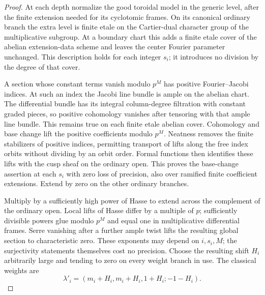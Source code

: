 \begin{proof}
At each depth normalize the good toroidal model in the generic
level, after the finite extension needed for its cyclotomic
frames.  On its canonical ordinary branch the extra level is
finite etale on the Cartier-dual character group of the
multiplicative subgroup.  At a boundary chart this adds a finite
etale cover of the abelian extension-data scheme and leaves the
center Fourier parameter unchanged.  This description holds for
each integer $s_i$; it introduces no division by the degree of
that cover.

A section whose constant terms vanish modulo $p^M$ has positive
Fourier--Jacobi indices.  At such an index the Jacobi line bundle
is ample on the abelian chart.  The differential bundle has its
integral column-degree filtration with constant graded pieces,
so positive cohomology vanishes after tensoring with that ample
line bundle.  This remains true on each finite etale abelian
cover.  Cohomology and base change lift the positive coefficients
modulo $p^M$.  Neatness removes the finite stabilizers of positive
indices, permitting transport of lifts along the free index
orbits without dividing by an orbit order.  Formal functions
then identifies these lifts with the cusp sheaf on the ordinary
open.  This proves the base-change assertion at each $s_i$ with
zero loss of precision, also over ramified finite coefficient
extensions.  Extend by zero on the other ordinary branches.

Multiply by a sufficiently high power of Hasse to extend across
the complement of the ordinary open.  Local lifts of Hasse
differ by a multiple of $p$; sufficiently divisible powers glue
modulo $p^M$ and equal one in multiplicative differential frames.
Serre vanishing after a further ample twist lifts the resulting
global section to characteristic zero.  These exponents may
depend on $i,s_i,M$; the surjectivity statements themselves cost
no precision.  Choose the resulting shift $H_i$ arbitrarily
large and tending to zero on every weight branch in use.  The
classical weights are
\[
             \lambda'_i=(m_i+H_i,m_i+H_i,1+H_i;-1-H_i).
\]


\end{proof}
